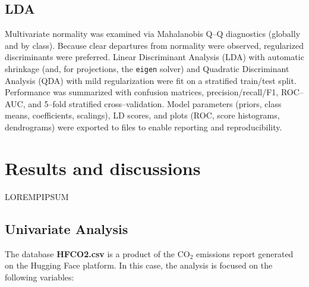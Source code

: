 \documentclass[journal]{IEEEtran}
\begin{document}
\subsection{LDA }

Multivariate normality was examined via Mahalanobis Q–Q diagnostics (globally and by class). Because clear departures from normality were observed, regularized discriminants were preferred. Linear Discriminant Analysis (LDA) with automatic shrinkage (and, for projections, the \texttt{eigen} solver) and Quadratic Discriminant Analysis (QDA) with mild regularization were fit on a stratified train/test split. Performance was summarized with confusion matrices, precision/recall/F1, ROC–AUC, and 5–fold stratified cross–validation. Model parameters (priors, class means, coefficients, scalings), LD scores, and plots (ROC, score histograms, dendrograms) were exported to files to enable reporting and reproducibility.


	\section{Results and discussions}

	\label{sec:results}
LOREMPIPSUM

	 \subsection{Univariate Analysis}
	 \label{ssec:unianal}
	 The database \textbf{HFCO2.csv} is a product of the $\text{CO}_2$ emissions report generated on the Hugging Face platform. In this case, the analysis is focused on the following variables:
\end{document}
